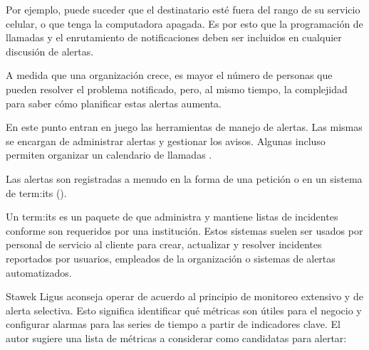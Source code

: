 Por ejemplo, puede suceder que el destinatario esté fuera del rango de su
servicio celular, o que tenga la computadora apagada. Es por esto que la
programación de llamadas y el enrutamiento de notificaciones deben ser
incluidos en cualquier discusión de alertas.

A medida que una organización crece, es mayor el número de personas que pueden
resolver el problema notificado, pero, al mismo tiempo, la complejidad para
saber cómo planificar estas alertas aumenta.

En este punto entran en juego las herramientas de manejo de alertas. Las mismas
se encargan de administrar alertas y gestionar los avisos. Algunas incluso
permiten organizar un calendario de llamadas \cite[p. ~
17]{monitoreo:monitoring_with_grapfite}.

Las alertas son registradas a menudo en la forma de una petición o 
en un sistema de \gls{term:its} ().

Un \gls{term:its} es un paquete de  que administra y mantiene listas de
incidentes conforme son requeridos por una institución. Estos sistemas suelen
ser usados por personal de servicio al cliente para crear, actualizar y
resolver incidentes reportados por usuarios, empleados de la organización o
sistemas de alertas automatizados.

Stawek Ligus aconseja operar de acuerdo al principio de monitoreo extensivo y
de alerta selectiva. Esto significa identificar qué métricas son útiles para el
negocio y configurar alarmas para las series de tiempo a partir de indicadores
clave. El autor sugiere una lista de métricas a considerar como candidatas para
alertar:

